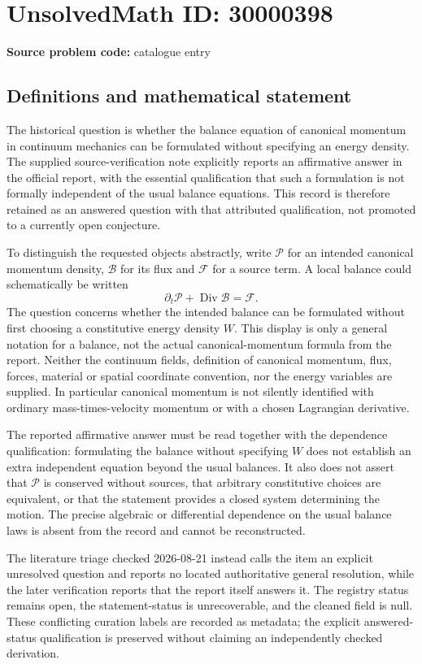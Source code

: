 \documentclass[11pt]{article}
\begin{document}
\section*{UnsolvedMath ID: 30000398}
\textbf{Source problem code:} catalogue entry
\subsection{Definitions and mathematical statement}
The historical question is whether the balance equation of canonical momentum in continuum mechanics can be formulated without specifying an energy density. The supplied source-verification note explicitly reports an affirmative answer in the official report, with the essential qualification that such a formulation is not formally independent of the usual balance equations. This record is therefore retained as an answered question with that attributed qualification, not promoted to a currently open conjecture.

To distinguish the requested objects abstractly, write \(\mathcal P\) for an intended canonical momentum density, \(\mathcal B\) for its flux and \(\mathcal F\) for a source term. A local balance could schematically be written
\[
 \partial_t\mathcal P+\operatorname{Div}\mathcal B=\mathcal F.
\]
The question concerns whether the intended balance can be formulated without first choosing a constitutive energy density \(W\). This display is only a general notation for a balance, not the actual canonical-momentum formula from the report. Neither the continuum fields, definition of canonical momentum, flux, forces, material or spatial coordinate convention, nor the energy variables are supplied. In particular canonical momentum is not silently identified with ordinary mass-times-velocity momentum or with a chosen Lagrangian derivative.

The reported affirmative answer must be read together with the dependence qualification: formulating the balance without specifying \(W\) does not establish an extra independent equation beyond the usual balances. It also does not assert that \(\mathcal P\) is conserved without sources, that arbitrary constitutive choices are equivalent, or that the statement provides a closed system determining the motion. The precise algebraic or differential dependence on the usual balance laws is absent from the record and cannot be reconstructed.

The literature triage checked 2026-08-21 instead calls the item an explicit unresolved question and reports no located authoritative general resolution, while the later verification reports that the report itself answers it. The registry status remains open, the statement-status is unrecoverable, and the cleaned field is null. These conflicting curation labels are recorded as metadata; the explicit answered-status qualification is preserved without claiming an independently checked derivation.
\end{document}
